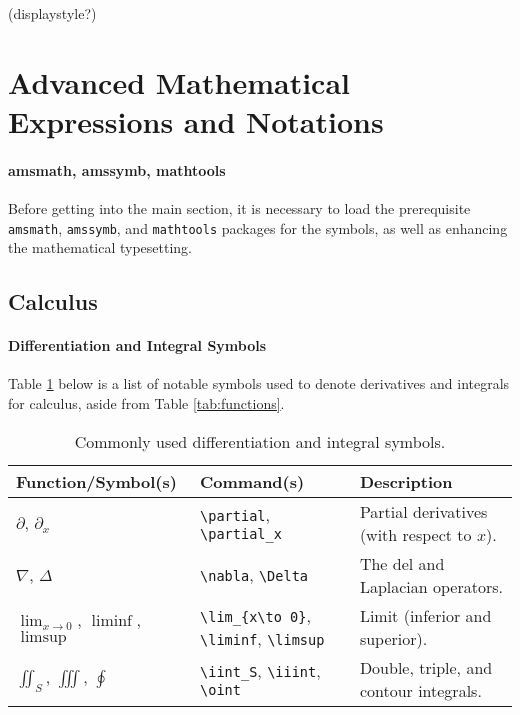 (displaystyle?)

\section{Advanced Mathematical Expressions and Notations}

\paragraph{amsmath, amssymb, mathtools}
Before getting into the main section, it is necessary to load the prerequisite \verb|amsmath|, \verb|amssymb|, and \verb|mathtools| packages for the symbols, as well as enhancing the mathematical typesetting.

\subsection{Calculus}

\paragraph{Differentiation and Integral Symbols}
Table \ref{tab:deintsymbol} below is a list of notable symbols used to denote derivatives and integrals for calculus, aside from Table \ref{tab:functions}.

\begin{table}[ht!]
\begin{tabularx}{\textwidth}{|p{}|>{\raggedright}p{}|X|}
\hline
Function/Symbol(s) & Command(s) & Description \\
\hline
$\partial$, $\partial_x$ & \texttt{\textbackslash partial}, \texttt{\textbackslash partial\_x} & Partial derivatives (with respect to $x$). \\
\hline
$\nabla$, $\Delta$ & \texttt{\textbackslash nabla}, \texttt{\textbackslash Delta} & The del and Laplacian operators. \\
\hline
$\lim_{x\to 0}$, $\liminf$, $\limsup$ & \texttt{\textbackslash lim\_\{x\textbackslash to 0\}}, \texttt{\textbackslash liminf}, \texttt{\textbackslash limsup} & Limit (inferior and superior). \\
\hline
$\iint_S$, $\iiint$, $\oint$ & \texttt{\textbackslash iint\_S}, \texttt{\textbackslash iiint}, \texttt{\textbackslash oint} & Double, triple\footnotemark, and contour integrals. \\
\hline
\end{tabularx}
\caption{Commonly used differentiation and integral symbols.}
\label{tab:deintsymbol}
\end{table}

